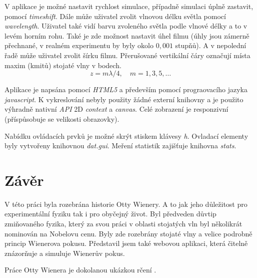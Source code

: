 \documentclass[12pt,a4paper,titlepage,final]{report}
\begin{document}
V aplikace je možné nastavit rychlost simulace, případně simulaci úplně zastavit, pomocí \emph{timeshift}.
Dále může uživatel zvolit vlnovou délku světla pomocí \emph{wavelength}. Uživatel také vidí barvu zvoleného 
světla podle vlnové délky a to v levém horním rohu. Také je zde možnost nastavit 
úhel filmu (úhly jsou zámerně přechnané, v realném experimentu by byly okolo $0,001$ stupňů). A v nepolední řadě může uživatel
zvolit šírku filmu. Přerušované vertikální čáry označují místa maxim (kmitů) stojaté vlny v bodech.
\begin{equation}
z = m\lambda / 4, \quad m=1,3,5,\ldots
\end{equation}

Aplikace je napsána pomocí \emph{HTML5} a především pomocí prograovacího jazyka \emph{javascript}. K vykreslování
nebyly použity žádné externí knihovny a je použito výhradně nativní \emph{API} 2D \emph{context} a \emph{canvas}.
Celé zobrazení je responzivní (příspůsobuje se velikosti obrazovky). 

Nabídku ovládacích prvků je možné skrýt stiskem klávesy \emph{h}. Ovladací elementy byly vytvořeny knihovnou \emph{dat.gui}. Meření 
statistik zajišťuje knihovna \emph{stats}.

\section{Závěr}
V této práci byla rozebrána historie Otty Wienery. A to jak jeho důležitost pro experimentální fyziku tak i pro obyčejný život. 
Byl předveden důvtip zmiňovaného fyzika, který za svou práci v oblasti stojatých vln byl několikrát nominován na Nobelovu cenu. Byly zde rozebrány 
stojaté vlny a velice podrobně princip Wienerova pokusu. Představil jsem také webovou aplikaci, která čitelně znázorňuje a simuluje
Wienerův pokus.

Práce Otty Wienera je dokolanou ukázkou rčení .

\textcolor{white}{
	\citep{wiki_otto}
	\citep{encyclopedia_otto}
	\cite{report}
	\citep{skullsinthestars}
}




\end{document}
